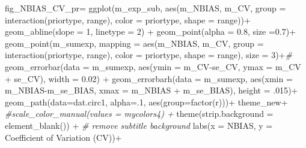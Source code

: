\documentclass[
]{article}
\newenvironment{Shaded}{\begin{snugshade}}{\end{snugshade}}
\newcommand{\AttributeTok}[1]{\textcolor[rgb]{0.77,0.63,0.00}{#1}}
\newcommand{\CommentTok}[1]{\textcolor[rgb]{0.56,0.35,0.01}{\textit{#1}}}
\newcommand{\DecValTok}[1]{\textcolor[rgb]{0.00,0.00,0.81}{#1}}
\newcommand{\FloatTok}[1]{\textcolor[rgb]{0.00,0.00,0.81}{#1}}
\newcommand{\FunctionTok}[1]{\textcolor[rgb]{0.00,0.00,0.00}{#1}}
\newcommand{\NormalTok}[1]{#1}
\newcommand{\OtherTok}[1]{\textcolor[rgb]{0.56,0.35,0.01}{#1}}
\newcommand{\SpecialCharTok}[1]{\textcolor[rgb]{0.00,0.00,0.00}{#1}}
\newcommand{\StringTok}[1]{\textcolor[rgb]{0.31,0.60,0.02}{#1}}
\begin{document}
\begin{Shaded}
\begin{Highlighting}[]
\NormalTok{fig\_NBIAS\_CV\_pr}\OtherTok{=}  \FunctionTok{ggplot}\NormalTok{(m\_exp\_sub, }\FunctionTok{aes}\NormalTok{(m\_NBIAS, m\_CV, }\AttributeTok{group =} \FunctionTok{interaction}\NormalTok{(priortype, range), }\AttributeTok{color =}\NormalTok{ priortype, }\AttributeTok{shape =}\NormalTok{ range))}\SpecialCharTok{+}
  \FunctionTok{geom\_abline}\NormalTok{(}\AttributeTok{slope =} \DecValTok{1}\NormalTok{, }\AttributeTok{linetype =} \DecValTok{2}\NormalTok{) }\SpecialCharTok{+}
  \FunctionTok{geom\_point}\NormalTok{(}\AttributeTok{alpha =} \FloatTok{0.8}\NormalTok{, }\AttributeTok{size =}\FloatTok{0.7}\NormalTok{)}\SpecialCharTok{+}
  \FunctionTok{geom\_point}\NormalTok{(m\_sumexp, }\AttributeTok{mapping =} \FunctionTok{aes}\NormalTok{(m\_NBIAS, m\_CV,  }\AttributeTok{group =} \FunctionTok{interaction}\NormalTok{(priortype, range), }\AttributeTok{color =}\NormalTok{ priortype, }\AttributeTok{shape =}\NormalTok{ range), }\AttributeTok{size =} \DecValTok{3}\NormalTok{)}\SpecialCharTok{+}\CommentTok{\#}
  \FunctionTok{geom\_errorbar}\NormalTok{(}\AttributeTok{data =}\NormalTok{ m\_sumexp, }\FunctionTok{aes}\NormalTok{(}\AttributeTok{ymin =}\NormalTok{ m\_CV}\SpecialCharTok{{-}}\NormalTok{se\_CV, }\AttributeTok{ymax =}\NormalTok{ m\_CV }\SpecialCharTok{+}\NormalTok{ se\_CV), }\AttributeTok{width =} \FloatTok{0.02}\NormalTok{) }\SpecialCharTok{+} 
  \FunctionTok{geom\_errorbarh}\NormalTok{(}\AttributeTok{data =}\NormalTok{ m\_sumexp, }\FunctionTok{aes}\NormalTok{(}\AttributeTok{xmin =}\NormalTok{ m\_NBIAS}\SpecialCharTok{{-}}\NormalTok{m\_se\_BIAS, }\AttributeTok{xmax =}\NormalTok{ m\_NBIAS }\SpecialCharTok{+}\NormalTok{ m\_se\_BIAS), }\AttributeTok{height =}\NormalTok{ .}\DecValTok{015}\NormalTok{)}\SpecialCharTok{+} 
  \FunctionTok{geom\_path}\NormalTok{(}\AttributeTok{data=}\NormalTok{dat.circ1, }\AttributeTok{alpha=}\NormalTok{.}\DecValTok{1}\NormalTok{, }\FunctionTok{aes}\NormalTok{(}\AttributeTok{group=}\FunctionTok{factor}\NormalTok{(r)))}\SpecialCharTok{+}
\NormalTok{  theme\_new}\SpecialCharTok{+} \CommentTok{\#scale\_color\_manual(values = mycolors4) +}
  \FunctionTok{theme}\NormalTok{(}\AttributeTok{strip.background =} \FunctionTok{element\_blank}\NormalTok{()) }\SpecialCharTok{+} \CommentTok{\# remove subtitle background}
  \FunctionTok{labs}\NormalTok{(}\AttributeTok{x =} \StringTok{\textquotesingle{}NBIAS\textquotesingle{}}\NormalTok{, }\AttributeTok{y =} \StringTok{\textquotesingle{}Coefficient of Variation (CV)\textquotesingle{}}\NormalTok{)}\SpecialCharTok{+}

\end{Highlighting}
\end{Shaded}
\end{document}
